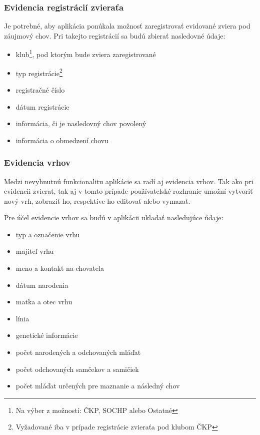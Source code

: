 \subsubsection{Evidencia registrácií zvieraťa}\label{evidencia-registracii-zvierata}
Je potrebné, aby aplikácia ponúkala možnosť zaregistrovať evidované zviera pod záujmový chov.
Pri takejto registrácií sa budú zbierať nasledovné údaje:

\begin{itemize}
	\item klub\footnote{Na výber z možností: ČKP, SOCHP alebo Ostatné}, pod ktorým bude zviera zaregistrované
	\item typ registrácie\footnote{Vyžadované iba v prípade registrácie zvieraťa pod klubom ČKP}
	\item registračné číslo
	\item dátum registrácie
	\item informácia, či je nasledovný chov povolený
	\item informácia o obmedzení chovu
\end{itemize}

\subsubsection{Evidencia vrhov}
Medzi nevyhnutnú funkcionalitu aplikácie sa radí aj evidencia vrhov. Tak ako pri evidencii zvierat, tak aj v tomto prípade používatelské rozhranie umožní vytvoriť nový vrh, zobraziť ho, respektíve ho editovať alebo vymazať. 

\hfill \break
Pre účel evidencie vrhov sa budú v aplikácii ukladať nasledujúce údaje:

\begin{itemize}
	\item typ a označenie vrhu
	\item majiteľ vrhu
	\item meno a kontakt na chovatela
	\item dátum narodenia
	\item matka a otec vrhu
	\item línia
	\item genetické informácie
	\item počet narodených a odchovaných mláďat
	\item počet odchovaných samčekov a samičiek
	\item počet mláďat určených pre maznanie a následný chov
\end{itemize}

